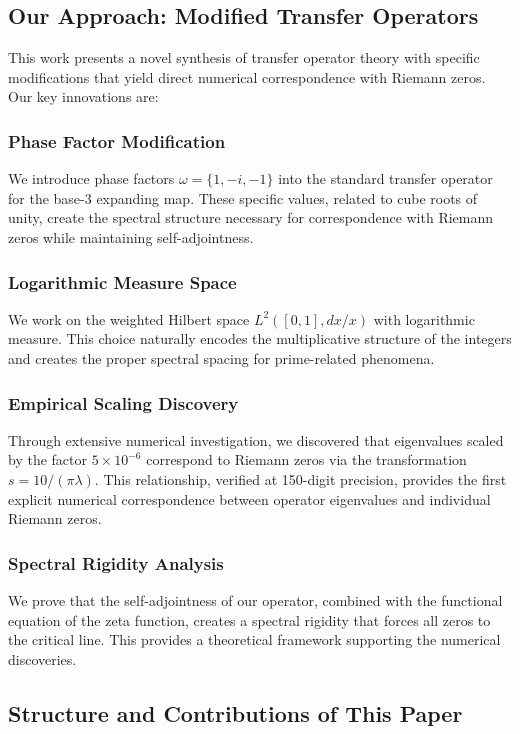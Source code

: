 \documentclass[12pt,letterpaper]{article}
\theoremstyle{plain}
\theoremstyle{definition}
\theoremstyle{remark}
\begin{document}
\subsection{Our Approach: Modified Transfer Operators}

This work presents a novel synthesis of transfer operator theory with specific modifications that yield direct numerical correspondence with Riemann zeros. Our key innovations are:

\subsubsection{Phase Factor Modification}
We introduce phase factors $\omega = \{1, -i, -1\}$ into the standard transfer operator for the base-3 expanding map. These specific values, related to cube roots of unity, create the spectral structure necessary for correspondence with Riemann zeros while maintaining self-adjointness.

\subsubsection{Logarithmic Measure Space}
We work on the weighted Hilbert space $L^2([0,1], dx/x)$ with logarithmic measure. This choice naturally encodes the multiplicative structure of the integers and creates the proper spectral spacing for prime-related phenomena.

\subsubsection{Empirical Scaling Discovery}
Through extensive numerical investigation, we discovered that eigenvalues scaled by the factor $5 \times 10^{-6}$ correspond to Riemann zeros via the transformation $s = 10/(\pi\lambda)$. This relationship, verified at 150-digit precision, provides the first explicit numerical correspondence between operator eigenvalues and individual Riemann zeros.

\subsubsection{Spectral Rigidity Analysis}
We prove that the self-adjointness of our operator, combined with the functional equation of the zeta function, creates a spectral rigidity that forces all zeros to the critical line. This provides a theoretical framework supporting the numerical discoveries.

\subsection{Structure and Contributions of This Paper}
\end{document}

